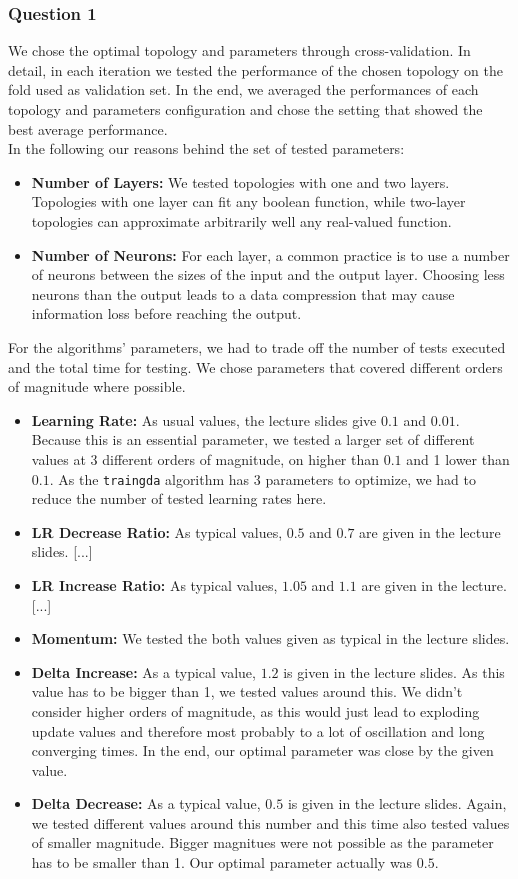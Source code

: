 \documentclass{article}
\begin{document}
\subsubsection*{Question 1}
We chose the optimal topology and parameters through cross-validation. In detail, in each iteration we tested the performance of the chosen topology on the fold used as validation set. In the end, we averaged the performances of each topology and parameters configuration and chose the setting that showed the best average performance.\\
In the following our reasons behind the set of tested parameters:
\begin{itemize}
\item \textbf{Number of Layers:} We tested topologies with one and two layers. Topologies with one layer can fit any boolean function, while two-layer topologies can approximate arbitrarily well any real-valued function.
\item \textbf{Number of Neurons:} For each layer, a common practice is to use a number of neurons between the sizes of the input and the output layer. Choosing less neurons than the output leads to a data compression that may cause information loss before reaching the output.
\end{itemize}
For the algorithms' parameters, we had to trade off the number of tests executed and the total time for testing. We chose parameters that covered different orders of magnitude where possible.
\begin{itemize}
\item \textbf{Learning Rate:} As usual values, the lecture slides give $0.1$ and $0.01$. Because this is an essential parameter, we tested a larger set of different values at 3 different orders of magnitude, on higher than $0.1$ and 1 lower than $0.1$. As the \verb$traingda$ algorithm has 3 parameters to optimize, we had to reduce the number of tested learning rates here.
\item \textbf{LR Decrease Ratio:} As typical values, $0.5$ and $0.7$ are given in the lecture slides. [...] %
\item \textbf{LR Increase Ratio:} As typical values, $1.05$ and $1.1$ are given in the lecture. [...] %
\item \textbf{Momentum:} We tested the both values given as typical in the lecture slides.
\item \textbf{Delta Increase:} As a typical value, $1.2$ is given in the lecture slides. As this value has to be bigger than 1, we tested values around this. We didn't consider higher orders of magnitude, as this would just lead to exploding update values and therefore most probably to a lot of oscillation and long converging times. In the end, our optimal parameter was close by the given value.
\item \textbf{Delta Decrease:} As a typical value, $0.5$ is given in the lecture slides. Again, we tested different values around this number and this time also tested values of smaller magnitude. Bigger magnitues were not possible as the parameter has to be smaller than 1. Our optimal parameter actually was $0.5$.
\end{itemize}
\end{document}
